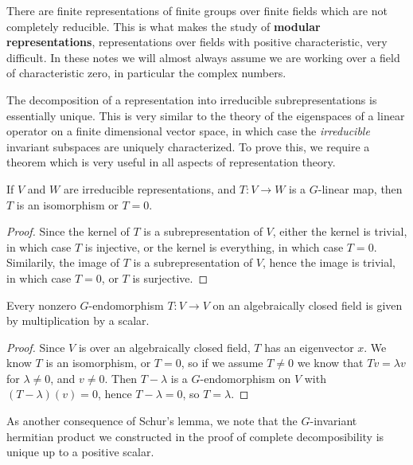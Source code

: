 There are finite representations of finite groups over finite fields which are not completely reducible. This is what makes the study of {\bf modular representations}, representations over fields with positive characteristic, very difficult. In these notes we will almost always assume we are working over a field of characteristic zero, in particular the complex numbers.

The decomposition of a representation into irreducible subrepresentations is essentially unique. This is very similar to the theory of the eigenspaces of a linear operator on a finite dimensional vector space, in which case the {\it irreducible} invariant subspaces are uniquely characterized. To prove this, we require a theorem which is very useful in all aspects of representation theory.

\begin{theorem}[Schur]
    If $V$ and $W$ are irreducible representations, and $T: V \to W$ is a $G$-linear map, then $T$ is an isomorphism or $T = 0$.
\end{theorem}
\begin{proof}
    Since the kernel of $T$ is a subrepresentation of $V$, either the kernel is trivial, in which case $T$ is injective, or the kernel is everything, in which case $T = 0$. Similarily, the image of $T$ is a subrepresentation of $V$, hence the image is trivial, in which case $T = 0$, or $T$ is surjective.
\end{proof}

\begin{corollary}
    Every nonzero $G$-endomorphism $T: V \to V$ on an algebraically closed field is given by multiplication by a scalar.
\end{corollary}
\begin{proof}
    Since $V$ is over an algebraically closed field, $T$ has an eigenvector $x$. We know $T$ is an isomorphism, or $T = 0$, so if we assume $T \neq 0$ we know that $Tv = \lambda v$ for $\lambda \neq 0$, and $v \neq 0$. Then $T - \lambda$ is a $G$-endomorphism on $V$ with $(T - \lambda)(v) = 0$, hence $T - \lambda = 0$, so $T = \lambda$.
\end{proof}

As another consequence of Schur's lemma, we note that the $G$-invariant hermitian product we constructed in the proof of complete decomposibility is unique up to a positive scalar.

